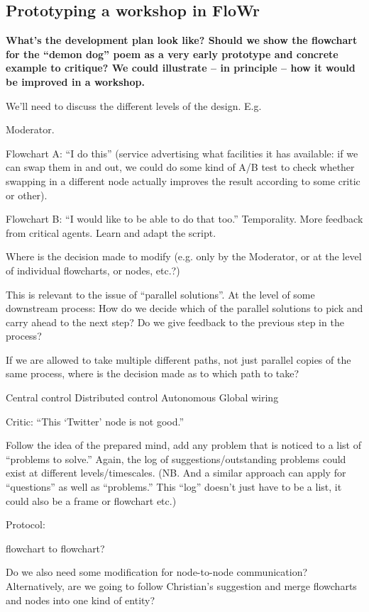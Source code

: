 \subsection{Prototyping a workshop in FloWr}
\begin{mdframed}
\textbf{What's the development plan look like?  Should we show the
  flowchart for the ``demon dog'' poem as a very early prototype and
  concrete example to critique?  We could illustrate -- in principle
  -- how it would be improved in a workshop.}

We'll need to discuss the different levels of the design.  E.g.

Moderator.  

Flowchart A: ``I do this'' (service advertising what facilities it has available: if we can swap them in and out, we could do some kind of A/B test to check whether swapping in a different node actually improves the result according to some critic or other).

Flowchart B: ``I would like to be able to do that too.''
Temporality. More feedback from critical agents.  Learn and adapt the script.

Where is the decision made to modify (e.g. only by the Moderator, or at the level of individual flowcharts, or nodes, etc.?)

This is relevant to the issue of ``parallel solutions''.  At the level of some downstream process: How do we decide which of the parallel solutions to pick and carry ahead to the next step?  Do we give feedback to the previous step in the process?

If we are allowed to take multiple different paths, not just parallel copies of the same process, where is the decision made as to which path to take?

Central control
Distributed control
Autonomous
Global wiring

Critic: ``This `Twitter' node is not good.''

Follow the idea of the prepared mind, add any problem that is noticed to a list of ``problems to solve.''  Again, the log of suggestions/outstanding problems could exist at different levels/timescales.  (NB. And a similar approach can apply for ``questions'' as well as ``problems.''  This ``log'' doesn't just have to be a list, it could also be a frame or flowchart etc.)

Protocol:

flowchart to flowchart?

Do we also need some modification for node-to-node communication?
Alternatively, are we going to follow Christian's suggestion and merge flowcharts and nodes into one kind of entity?


\end{mdframed}
